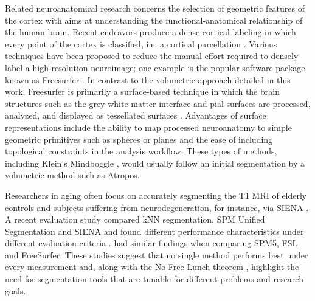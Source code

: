 \documentclass[11pt,english]{article}
\begin{document}
Related neuroanatomical research concerns the selection of geometric
features of the cortex \citep[e.g.][]{Goualher1999} with aims at
understanding the functional-anatomical relationship of the human
brain. Recent endeavors produce a dense cortical labeling in which
every point of the cortex is classified, i.e. a cortical parcellation
\citep{Fischl2004,Heckemann2006,Destrieux2010}.  Various techniques
have been proposed to reduce the manual effort required to densely
label a high-resolution neuroimage; one example is the popular
software package known as Freesurfer
\citep{Dale1999,Fischl1999,Fischl2004}.  In contrast to the volumetric
approach detailed in this work, Freesurfer is primarily a
surface-based technique in which the brain structures such as the
grey-white matter interface and pial surfaces are processed, analyzed,
and displayed as tessellated surfaces \citep{Dale1999,Fischl1999}.
Advantages of surface representations include the ability to map
processed neuroanatomy to simple geometric primitives such as spheres
or planes and the ease of including topological constraints in the
analysis workflow.  These types of methods, including Klein's
Mindboggle \citep{Klein2005}, would usually follow an initial
segmentation by a volumetric method such as Atropos.


Researchers in aging often focus on
accurately segmenting the T1 MRI of elderly controls and subjects
suffering from neurodegeneration, for instance, via SIENA \citep{Smith2007}.  A recent evaluation study 
compared kNN segmentation, SPM Unified Segmentation and SIENA and
found different performance
characteristics under different evaluation criteria
\citep{Bresser2011}.  \cite{Klauschen2009} had similar findings when
comparing SPM5, FSL and FreeSurfer.  These studies suggest that no
single method performs best under every measurement and, along with the No
Free Lunch theorem \citep{Wolpert1997}, highlight the need for segmentation tools that are tunable for different
problems and research goals.  
\end{document}
